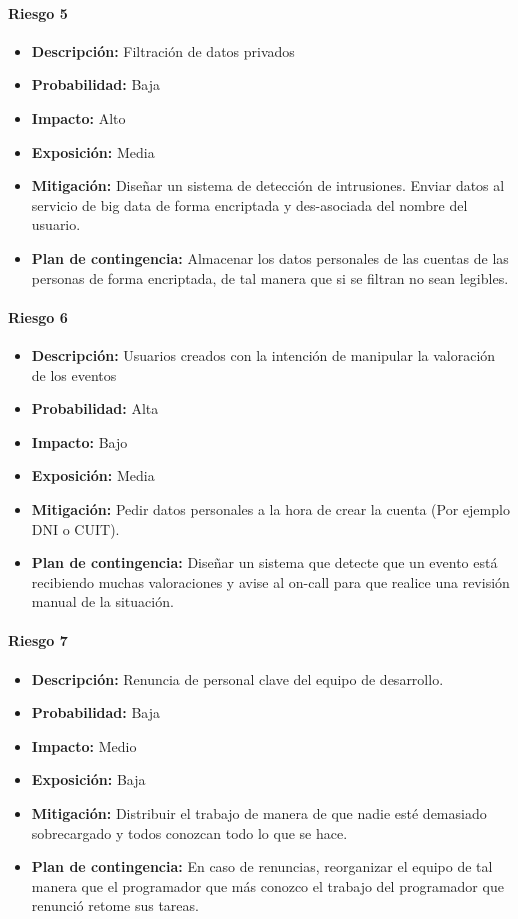 \paragraph{Riesgo 5}
\begin{itemize}
  \item \textbf{Descripción:} Filtración de datos privados
  \item \textbf{Probabilidad:} Baja
  \item \textbf{Impacto:} Alto
  \item \textbf{Exposición:} Media
  \item \textbf{Mitigación:} Diseñar un sistema de detección de intrusiones. Enviar datos al servicio de big data de forma encriptada y des-asociada del nombre del usuario.
  \item \textbf{Plan de contingencia:} Almacenar los datos personales de las cuentas de las personas de forma encriptada, de tal manera que si se filtran no sean legibles.
\end{itemize}

\paragraph{Riesgo 6}
\begin{itemize}
  \item \textbf{Descripción:} Usuarios creados con la intención de manipular la valoración de los eventos
  \item \textbf{Probabilidad:} Alta
  \item \textbf{Impacto:} Bajo
  \item \textbf{Exposición:} Media
  \item \textbf{Mitigación:} Pedir datos personales a la hora de crear la cuenta (Por ejemplo DNI o CUIT).
  \item \textbf{Plan de contingencia:} Diseñar un sistema que detecte que un evento está recibiendo muchas valoraciones y avise al on-call para que realice una revisión manual de la situación.
\end{itemize}

\paragraph{Riesgo 7}
\begin{itemize}
  \item \textbf{Descripción:} Renuncia de personal clave del equipo de desarrollo.
  \item \textbf{Probabilidad:} Baja
  \item \textbf{Impacto:} Medio
  \item \textbf{Exposición:} Baja
  \item \textbf{Mitigación:} Distribuir el trabajo de manera de que nadie esté demasiado sobrecargado y todos conozcan todo lo que se hace.
  \item \textbf{Plan de contingencia:} En caso de renuncias, reorganizar el equipo de tal manera que el programador que más conozco el trabajo del programador que renunció retome sus tareas.
\end{itemize}

